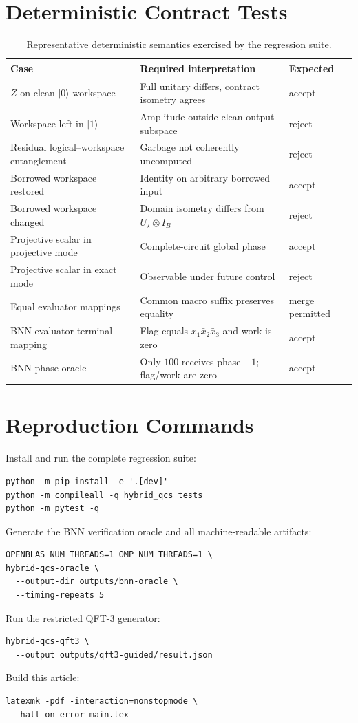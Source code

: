 \section{Deterministic Contract Tests}

\begin{table}[h]
\caption{Representative deterministic semantics exercised by the regression suite.}
\centering
\begin{tabularx}{\textwidth}{lXl}
\toprule
Case & Required interpretation & Expected\\
\midrule
$Z$ on clean $\lvert0\rangle$ workspace & Full unitary differs, contract isometry agrees & accept\\
Workspace left in $\lvert1\rangle$ & Amplitude outside clean-output subspace & reject\\
Residual logical--workspace entanglement & Garbage not coherently uncomputed & reject\\
Borrowed workspace restored & Identity on arbitrary borrowed input & accept\\
Borrowed workspace changed & Domain isometry differs from $U_\star\otimes I_B$ & reject\\
Projective scalar in projective mode & Complete-circuit global phase & accept\\
Projective scalar in exact mode & Observable under future control & reject\\
Equal evaluator mappings & Common macro suffix preserves equality & merge permitted\\
BNN evaluator terminal mapping & Flag equals $x_1\bar x_2\bar x_3$ and work is zero & accept\\
BNN phase oracle & Only $100$ receives phase $-1$; flag/work are zero & accept\\
\bottomrule
\end{tabularx}
\end{table}

\section{Reproduction Commands}

Install and run the complete regression suite:
\begin{verbatim}
python -m pip install -e '.[dev]'
python -m compileall -q hybrid_qcs tests
python -m pytest -q
\end{verbatim}

Generate the BNN verification oracle and all machine-readable artifacts:
\begin{verbatim}
OPENBLAS_NUM_THREADS=1 OMP_NUM_THREADS=1 \
hybrid-qcs-oracle \
  --output-dir outputs/bnn-oracle \
  --timing-repeats 5
\end{verbatim}

Run the restricted QFT-3 generator:
\begin{verbatim}
hybrid-qcs-qft3 \
  --output outputs/qft3-guided/result.json
\end{verbatim}

Build this article:
\begin{verbatim}
latexmk -pdf -interaction=nonstopmode \
  -halt-on-error main.tex
\end{verbatim}
